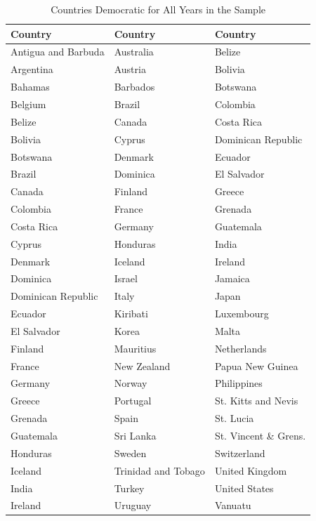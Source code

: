 \begin{appendix}
\begin{table}[h!]
  \caption{Countries Democratic for All Years in the Sample}\label{demo_perm}
\centering
\begin{tabular}{l l l}
\hline
Country & Country & Country \\
\hline
Antigua and Barbuda & Australia & Belize \\
Argentina & Austria & Bolivia \\
Bahamas & Barbados & Botswana \\
Belgium & Brazil & Colombia \\
Belize & Canada & Costa Rica \\
Bolivia & Cyprus & Dominican Republic \\
Botswana & Denmark & Ecuador \\
Brazil & Dominica & El Salvador \\
Canada & Finland & Greece \\
Colombia & France & Grenada \\
Costa Rica & Germany & Guatemala \\
Cyprus & Honduras & India \\
Denmark & Iceland & Ireland \\
Dominica & Israel & Jamaica \\
Dominican Republic & Italy & Japan \\
Ecuador & Kiribati & Luxembourg \\
El Salvador & Korea & Malta \\
Finland & Mauritius & Netherlands \\
France & New Zealand & Papua New Guinea \\
Germany & Norway & Philippines \\
Greece & Portugal & St. Kitts and Nevis \\
Grenada & Spain & St. Lucia \\
Guatemala & Sri Lanka & St. Vincent \& Grens. \\
Honduras & Sweden & Switzerland \\
Iceland & Trinidad and Tobago & United Kingdom \\
India & Turkey & United States \\
Ireland & Uruguay & Vanuatu \\
\hline
\end{tabular}
\end{table}


\end{appendix}
